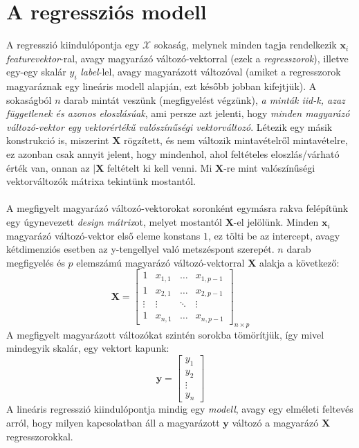 \documentclass[14p]{report}
\def\pmb{\boldsymbol}
\begin{document}
	\section{A regressziós modell}
	A regresszió kiindulópontja egy $\mathscr{X}$ sokaság, melynek minden tagja rendelkezik $\pmb{x}_i$ \emph{featurevektor}-ral, avagy magyarázó változó-vektorral (ezek a \emph{regresszorok}), illetve egy-egy skalár $y_i$ \emph{label}-lel, avagy magyarázott változóval (amiket a regresszorok magyaráznak egy lineáris modell alapján, ezt később jobban kifejtjük). A sokaságból $n$ darab mintát veszünk (megfigyelést végzünk), \emph{a minták iid-k, azaz függetlenek és azonos eloszlásúak}, ami persze azt jelenti, hogy \emph{minden magyarázó változó-vektor egy vektorértékű valószínűségi vektorváltozó}. Létezik egy másik konstrukció is, miszerint $\pmb{X}$ rögzített, és nem változik mintavételről mintavételre, ez azonban csak annyit jelent, hogy mindenhol, ahol feltételes eloszlás/várható érték van, onnan az $\mid \pmb{X}$ feltételt ki kell venni. Mi $\pmb{X}$-re mint valószínűségi vektorváltozók mátrixa tekintünk mostantól.
	\\
	\\
	A megfigyelt magyarázó változó-vektorokat soronként egymásra rakva felépítünk egy úgynevezett \emph{design mátrix}ot, melyet mostantól $\pmb{X}$-el jelölünk. Minden $\pmb{x}_i$ magyarázó változó-vektor első eleme konstans $1$, ez tölti be az intercept, avagy kétdimenziós esetben az y-tengellyel való metszéspont szerepét. $n$ darab megfigyelés és $p$ elemszámú magyarázó változó-vektorral $\pmb{X}$ alakja a következő:
	\[
	\pmb{X} = 
	\begin{bmatrix}
		1 & x_{1,1} & \dots & x_{1,p-1} \\
		1 & x_{2,1} & \dots & x_{2,p-1} \\
		\vdots & \vdots & \ddots & \vdots \\
		1 & x_{n,1} & \dots & x_{n,p-1}	
	\end{bmatrix}_{n \times p}
	\]
	A megfigyelt magyarázott változókat szintén sorokba tömörítjük, így mivel mindegyik skalár, egy vektort kapunk:
	\[
	\pmb{y} =
	\begin{bmatrix}
		y_1 \\
		y_2 \\
		\vdots \\
		y_n
	\end{bmatrix}
	\]
	A lineáris regresszió kiindulópontja mindig egy \emph{modell}, avagy egy elméleti feltevés arról, hogy milyen kapcsolatban áll a magyarázott $\pmb{y}$ változó a magyarázó $\pmb{X}$ regresszorokkal.
\end{document}
